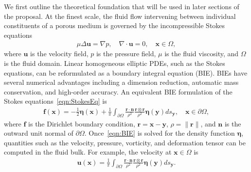 \documentclass[11pt]{article}
\newcommand{\bvec}[1]{{\mathbf{#1}}}
\newcommand{\grad}{\nabla}
\newcommand{\uu}{\bvec{u}}
\newcommand{\xx}{\bvec{x}}
\newcommand{\nn}{{\mathbf{n}}}
\newcommand{\bd}{\partial}
\newcommand{\eeta}{\boldsymbol{\eta}}
\newcommand{\rr}{\mathbf{r}}
\newcommand{\ff}{\mathbf{f}}
\newcommand{\yy}{\mathbf{y}}
\begin{document}
We first outline the theoretical foundation that will be used in later sections of the proposal. At the finest scale, the fluid flow intervening between individual constituents of a porous medium is governed by the incompressible Stokes equations
\begin{align}
  \label{eqn:StokesEq}
  \mu \Delta \uu = \grad p, \quad
  \grad \cdot \uu = 0, \quad \xx \in \Omega,
\end{align}
where $\uu$ is the velocity field, $p$ is the pressure field, $\mu$ is the fluid viscosity, and $\Omega$ is the fluid domain. Linear homogeneous elliptic PDEs, such as the Stokes equations, can be reformulated as a boundary integral equation (BIE).  BIEs have several numerical advantages including a dimension reduction, automatic mass conservation, and high-order accuracy. An equivalent BIE formulation of the Stokes equations~\eqref{eqn:StokesEq} is
\begin{align}
  \label{eqn:BIE}
  \ff(\xx) = -\frac{1}{2}\eeta(\xx) + \frac{1}{\pi} \int_{\bd\Omega}
    \frac{\rr \cdot \nn}{\rho^2} \frac{\rr \otimes \rr}{\rho^2}
    \eeta(\yy) ds_\yy, \quad \xx \in \bd\Omega,
\end{align}
where $\ff$ is the Dirichlet boundary condition, $\rr = \xx - \yy$, $\rho = \|\rr\|$, and $\nn$ is the outward unit normal of $\bd\Omega$.  Once~\eqref{eqn:BIE} is solved for the density function $\eeta$, quantities such as the velocity, pressure, vorticity, and deformation tensor can be computed in the fluid bulk.  For example, the velocity at $\xx \in \Omega$ is 
\begin{align}
  \uu(\xx) = \frac{1}{\pi} \int_{\bd\Omega}
    \frac{\rr \cdot \nn}{\rho^2} \frac{\rr \otimes \rr}{\rho^2}
    \eeta(\yy) ds_\yy.
\end{align}
\end{document}
